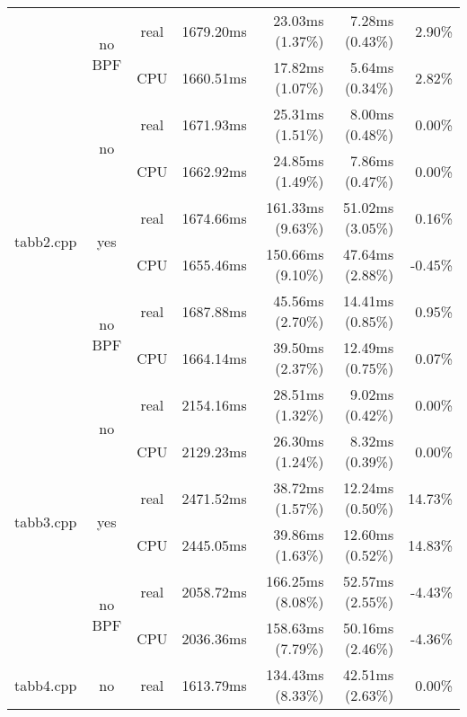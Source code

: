 \documentclass[en]{pracamgr}
\begin{document}
\begin{appendices}
\begin{small}
\begin{longtable}{|l|c|c|r|r|r|r|}
                            \cline{2-7}
                            & \multirow{2}{*}{no BPF} & real & 1679.20ms & 23.03ms (1.37\%) & 7.28ms (0.43\%) & 2.90\% \\*
                            &                         & CPU  & 1660.51ms & 17.82ms (1.07\%) & 5.64ms (0.34\%) & 2.82\% \\
\hline
\multirow{6}{*}{tabb2.cpp}  & \multirow{2}{*}{no}     & real & 1671.93ms & 25.31ms (1.51\%) & 8.00ms (0.48\%) & 0.00\% \\*
                            &                         & CPU  & 1662.92ms & 24.85ms (1.49\%) & 7.86ms (0.47\%) & 0.00\% \\*
                            \cline{2-7}
                            & \multirow{2}{*}{yes}    & real & 1674.66ms & 161.33ms (9.63\%) & 51.02ms (3.05\%) & 0.16\% \\*
                            &                         & CPU  & 1655.46ms & 150.66ms (9.10\%) & 47.64ms (2.88\%) & -0.45\% \\*
                            \cline{2-7}
                            & \multirow{2}{*}{no BPF} & real & 1687.88ms & 45.56ms (2.70\%) & 14.41ms (0.85\%) & 0.95\% \\*
                            &                         & CPU  & 1664.14ms & 39.50ms (2.37\%) & 12.49ms (0.75\%) & 0.07\% \\
\hline
\multirow{6}{*}{tabb3.cpp}  & \multirow{2}{*}{no}     & real & 2154.16ms & 28.51ms (1.32\%) & 9.02ms (0.42\%) & 0.00\% \\*
                            &                         & CPU  & 2129.23ms & 26.30ms (1.24\%) & 8.32ms (0.39\%) & 0.00\% \\*
                            \cline{2-7}
                            & \multirow{2}{*}{yes}    & real & 2471.52ms & 38.72ms (1.57\%) & 12.24ms (0.50\%) & 14.73\% \\*
                            &                         & CPU  & 2445.05ms & 39.86ms (1.63\%) & 12.60ms (0.52\%) & 14.83\% \\*
                            \cline{2-7}
                            & \multirow{2}{*}{no BPF} & real & 2058.72ms & 166.25ms (8.08\%) & 52.57ms (2.55\%) & -4.43\% \\*
                            &                         & CPU  & 2036.36ms & 158.63ms (7.79\%) & 50.16ms (2.46\%) & -4.36\% \\
\hline
\multirow{6}{*}{tabb4.cpp}  & \multirow{2}{*}{no}     & real & 1613.79ms & 134.43ms (8.33\%) & 42.51ms (2.63\%) & 0.00\% \\*

\end{longtable}
\end{small}
\end{appendices}
\end{document}
